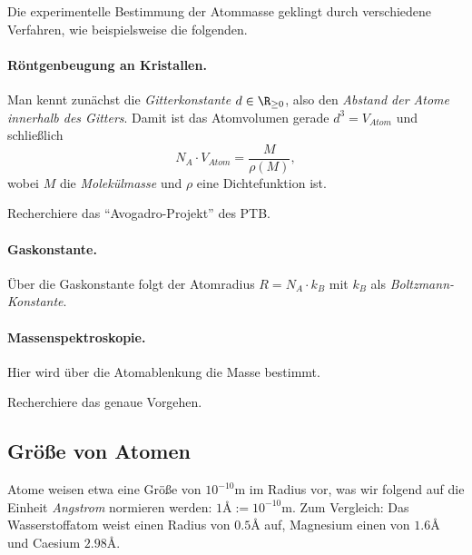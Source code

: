 \documentclass{subfiles}
\begin{document}
        Die experimentelle Bestimmung der Atommasse geklingt durch verschiedene Verfahren, wie beispielsweise die folgenden.
        
        \paragraph*{Röntgenbeugung an Kristallen.}\label{Ub:Atomvolumen}\marginnote{$\to$ \hyperref[Ub:AtomEigenschaften]{\faBook}}
        Man kennt zunächst die \emph{Gitterkonstante} $d\in\R_{\geq 0}$, also den \emph{Abstand der Atome innerhalb des Gitters}. Damit ist das Atomvolumen gerade $d^3=V_{\textit{Atom}}$ und schließlich
        \[
            N_A\cdot V_{\textit{Atom}}=\frac{M}{\rho(M)},
        \]
        wobei $M$ die \emph{Molekülmasse} und $\rho$ eine Dichtefunktion ist. 
        \begin{Aufgabe}
            \nr{} Recherchiere das \enquote{Avogadro-Projekt} des PTB.
        \end{Aufgabe}

        \paragraph*{Gaskonstante.} Über die Gaskonstante folgt der Atomradius $R=N_A\cdot k_B$ mit $k_B$ als \emph{Boltzmann-Konstante}. 

        \paragraph*{Massenspektroskopie.} Hier wird über die Atomablenkung die Masse bestimmt.
        \begin{Aufgabe}
            \nr{} Recherchiere das genaue Vorgehen. 
        \end{Aufgabe}

        \subsection{Größe von Atomen}\label{Ub:Angstrom}\marginnote{$\to$ \hyperref[Ub:AtomEigenschaften]{\faBook}}
            Atome weisen etwa eine Größe von $10^{-10}\si\metre$ im Radius vor, was wir folgend auf die Einheit \emph{Angstrom} normieren werden: $1\si\angstrom:=10^{-10}\si\metre$. Zum Vergleich: Das Wasserstoffatom weist einen Radius von $0.5\si\angstrom$ auf, Magnesium einen von $1.6\si\angstrom$ und Caesium $2.98\si\angstrom$. 
\end{document}

